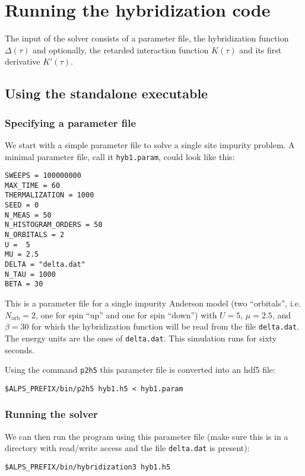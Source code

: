 \documentclass[aps,prb,floatfix,superscriptaddress,twocolumn,notitlepage]{revtex4-1}
\begin{document}
\section{Running the hybridization code}

The input of the solver consists of a parameter file, the hybridization function $\Delta(\tau)$ and optionally, the retarded interaction function $K(\tau)$ and its first derivative $K'(\tau)$.

\subsection{Using the standalone executable}

\subsubsection{Specifying a parameter file}
We start with a simple parameter file to solve a single site impurity problem. A minimal parameter file, call it \verb#hyb1.param#, could look like this:
\begin{verbatim}
SWEEPS = 100000000
MAX_TIME = 60
THERMALIZATION = 1000
SEED = 0
N_MEAS = 50
N_HISTOGRAM_ORDERS = 50
N_ORBITALS = 2
U =  5
MU = 2.5
DELTA = "delta.dat"
N_TAU = 1000
BETA = 30
\end{verbatim}
This is a parameter file for a single impurity Anderson model (two ``orbitals'', i.e. $N_{\text{orb}}=2$, one for spin ``up'' and one for spin ``down'') with $U=5$, $\mu=2.5$, and $\beta=30$ for which the hybridization function will be read from the file \verb#delta.dat#. The energy units are the ones of \verb#delta.dat#. This simulation runs for sixty seconds.

Using the command \verb#p2h5# this parameter file is converted into an hdf5 file:
\begin{verbatim}
$ALPS_PREFIX/bin/p2h5 hyb1.h5 < hyb1.param
\end{verbatim}

\subsubsection{Running the solver}

We can then run the program using this parameter file (make sure this is in a directory with read/write access and the file \verb#delta.dat# is present):
\begin{verbatim}
$ALPS_PREFIX/bin/hybridization3 hyb1.h5
\end{verbatim}
\end{document}
